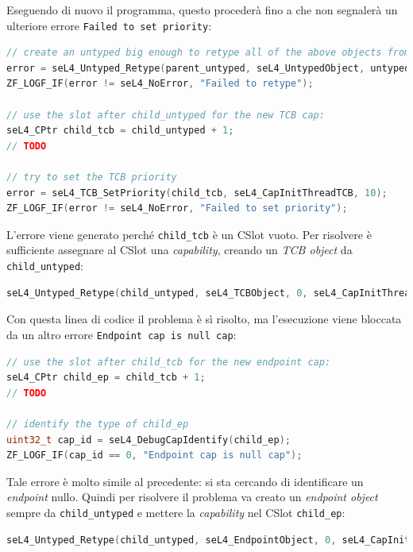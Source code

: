 Eseguendo di nuovo il programma, questo procederà fino a che non segnalerà un ulteriore errore \texttt{Failed to set priority}:
\begin{lstlisting}[language=C++]
// create an untyped big enough to retype all of the above objects from
error = seL4_Untyped_Retype(parent_untyped, seL4_UntypedObject, untyped_size_bits, seL4_CapInitThreadCNode, 0, 0, child_untyped, 1);
ZF_LOGF_IF(error != seL4_NoError, "Failed to retype");

// use the slot after child_untyped for the new TCB cap:
seL4_CPtr child_tcb = child_untyped + 1;
// TODO

// try to set the TCB priority
error = seL4_TCB_SetPriority(child_tcb, seL4_CapInitThreadTCB, 10);
ZF_LOGF_IF(error != seL4_NoError, "Failed to set priority");
\end{lstlisting}

L'errore viene generato perché \texttt{child\_tcb} è un CSlot vuoto. Per risolvere è sufficiente assegnare al CSlot una \textit{capability}, creando un \textit{TCB object} da \texttt{child\_untyped}:
\begin{lstlisting}[language=C++]
seL4_Untyped_Retype(child_untyped, seL4_TCBObject, 0, seL4_CapInitThreadCNode, 0, 0, child_tcb, 1);
\end{lstlisting}

Con questa linea di codice il problema è sì risolto, ma l'esecuzione viene bloccata da un altro errore \texttt{Endpoint cap is null cap}:
\begin{lstlisting}[language=C++]
// use the slot after child_tcb for the new endpoint cap:
seL4_CPtr child_ep = child_tcb + 1;
// TODO

// identify the type of child_ep
uint32_t cap_id = seL4_DebugCapIdentify(child_ep);
ZF_LOGF_IF(cap_id == 0, "Endpoint cap is null cap");
\end{lstlisting}

Tale errore è molto simile al precedente: si sta cercando di identificare un \textit{endpoint} nullo. Quindi per risolvere il problema va creato un \textit{endpoint object} sempre da \texttt{child\_untyped} e mettere la \textit{capability} nel CSlot \texttt{child\_ep}:
\begin{lstlisting}[language=C++]
seL4_Untyped_Retype(child_untyped, seL4_EndpointObject, 0, seL4_CapInitThreadCNode, 0, 0, child_ep, 1);
\end{lstlisting}

